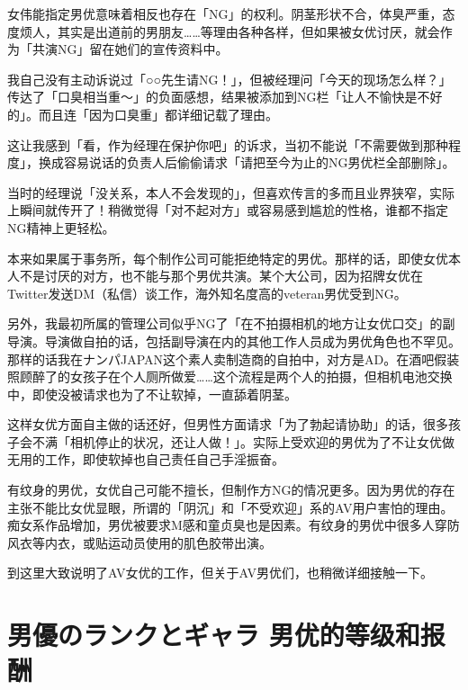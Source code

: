 \documentclass[12pt,UTF8]{ctexbook}
\begin{document}
女伟能指定男优意味着相反也存在「NG」的权利。阴茎形状不合，体臭严重，态度烦人，其实是出道前的男朋友……等理由各种各样，但如果被女优讨厌，就会作为「共演NG」留在她们的宣传资料中。

我自己没有主动诉说过「○○先生请NG！」，但被经理问「今天的现场怎么样？」传达了「口臭相当重〜」的负面感想，结果被添加到NG栏「让人不愉快是不好的」。而且连「因为口臭重」都详细记载了理由。

这让我感到「看，作为经理在保护你吧」的诉求，当初不能说「不需要做到那种程度」，换成容易说话的负责人后偷偷请求「请把至今为止的NG男优栏全部删除」。

当时的经理说「没关系，本人不会发现的」，但喜欢传言的多而且业界狭窄，实际上瞬间就传开了！稍微觉得「对不起对方」或容易感到尴尬的性格，谁都不指定NG精神上更轻松。

本来如果属于事务所，每个制作公司可能拒绝特定的男优。那样的话，即使女优本人不是讨厌的对方，也不能与那个男优共演。某个大公司，因为招牌女优在Twitter发送DM（私信）谈工作，海外知名度高的veteran男优受到NG。

另外，我最初所属的管理公司似乎NG了「在不拍摄相机的地方让女优口交」的副导演。导演做自拍的话，包括副导演在内的其他工作人员成为男优角色也不罕见。那样的话我在ナンパJAPAN这个素人卖制造商的自拍中，对方是AD。在酒吧假装照顾醉了的女孩子在个人厕所做爱……这个流程是两个人的拍摄，但相机电池交换中，即使没被请求也为了不让软掉，一直舔着阴茎。

这样女优方面自主做的话还好，但男性方面请求「为了勃起请协助」的话，很多孩子会不满「相机停止的状况，还让人做！」。实际上受欢迎的男优为了不让女优做无用的工作，即使软掉也自己责任自己手淫振奋。

有纹身的男优，女优自己可能不擅长，但制作方NG的情况更多。因为男优的存在主张不能比女优显眼，所谓的「阴沉」和「不受欢迎」系的AV用户害怕的理由。痴女系作品增加，男优被要求M感和童贞臭也是因素。有纹身的男优中很多人穿防风衣等内衣，或贴运动员使用的肌色胶带出演。

到这里大致说明了AV女优的工作，但关于AV男优们，也稍微详细接触一下。

\section{男優のランクとギャラ
男优的等级和报酬}
\end{document}
